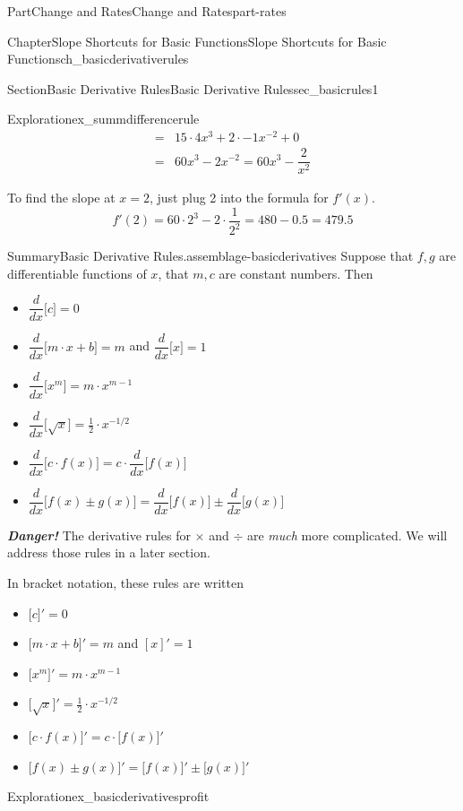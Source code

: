 \documentclass[oneside,10pt,]{tufte-book}
\newcommand{\alert}[1]{\textbf{\textit{#1}}}
\numberwithin{equation}{chapter}
\newcommand{\ddx}[1]{ \dfrac{d}{dx} \Big[ #1 \Big]  }
\newcommand{\D}[1]{ \Big[ #1 \Big]'  }
\newcommand{\amp}{&}
\begin{document}
\begin{partptx}{Part}{Change and Rates}{}{Change and Rates}{}{}{part-rates}
\begin{chapterptx}{Chapter}{Slope Shortcuts for Basic Functions}{}{Slope Shortcuts for Basic Functions}{}{}{ch_basicderivativerules}
\begin{sectionptx}{Section}{Basic Derivative Rules}{}{Basic Derivative Rules}{}{}{sec_basicrules1}
\begin{exploration}{Exploration}{}{ex_summdifferencerule}
\begin{align*}
= \amp 15\cdot 4x^3 + 2\cdot -1 x^{-2} + 0\\
= \amp 60x^3 - 2 x^{-2} = 60 x^3 - \dfrac{2}{x^2}
\end{align*}
%
\par
To find the slope at \(x=2\), just plug 2 into the formula for \(f'(x)\).%
\begin{equation*}
f'(2) = 60 \cdot 2^3 - 2\cdot \frac{1}{2^2} = 480 - 0.5 = 479.5
\end{equation*}
%
\end{exploration}%
\begin{assemblage}{Summary}{Basic Derivative Rules.}{assemblage-basicderivatives}%
Suppose that \(f,g\) are differentiable functions of \(x\), that \(m,c\) are constant numbers.  Then%
\begin{itemize}[label=\textbullet]
\item{}\(\displaystyle \ddx{c}=0\)%
\item{}\(\ddx{m\cdot x+b}=m\) and \(\ddx{x} = 1\)%
\item{}\(\displaystyle \ddx{x^m}=m\cdot x^{m-1}\)%
\item{}\(\displaystyle \ddx{ \sqrt{x}}=\frac{1}{2}\cdot x^{-1/2}\)%
\item{}\(\displaystyle \ddx{ c\cdot f(x)}=c\cdot \ddx{f(x)}\)%
\item{}\(\displaystyle \ddx{f(x) \pm g(x)} = \ddx{f(x)} \pm \ddx{g(x)}\)%
\end{itemize}
%
\par
\alert{Danger!} The derivative rules for \(\times\) and \(\div\) are \emph{much} more complicated.  We will address those rules in a later section.%
\par
In bracket notation, these rules are written%
\begin{itemize}[label=\textbullet]
\item{}\(\displaystyle \D{c}=0\)%
\item{}\(\D{m\cdot x+b} =m\) and \([x]' = 1 \)%
\item{}\(\displaystyle \D{x^m} =m\cdot x^{m-1}\)%
\item{}\(\displaystyle \D{\sqrt{x}}=\frac{1}{2}\cdot x^{-1/2}\)%
\item{}\(\displaystyle \D{ c\cdot f(x)} =c\cdot \D{f(x)}\)%
\item{}\(\displaystyle \D{f(x) \pm g(x)}  = \D{f(x)} \pm \D{g(x)}\)%
\end{itemize}
%
\end{assemblage}
\begin{exploration}{Exploration}{}{ex_basicderivativesprofit}%

\end{exploration}
\end{sectionptx}
\end{chapterptx}
\end{partptx}
\end{document}
